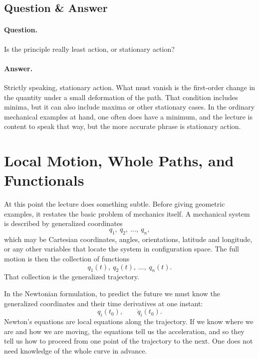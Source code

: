 \subsection{Question \& Answer}

\paragraph{Question.} Is the principle really least action, or stationary action?

\paragraph{Answer.} Strictly speaking, stationary action. What must vanish is the first-order change in the quantity under a small deformation of the path. That condition includes minima, but it can also include maxima or other stationary cases. In the ordinary mechanical examples at hand, one often does have a minimum, and the lecture is content to speak that way, but the more accurate phrase is stationary action.

\section{Local Motion, Whole Paths, and Functionals}

At this point the lecture does something subtle. Before giving geometric examples, it restates the basic problem of mechanics itself. A mechanical system is described by generalized coordinates
\begin{equation}
q_1,\ q_2,\ \dots,\ q_n,
\end{equation}
which may be Cartesian coordinates, angles, orientations, latitude and longitude, or any other variables that locate the system in configuration space. The full motion is then the collection of functions
\begin{equation}
q_1(t),\ q_2(t),\ \dots,\ q_n(t).
\end{equation}
That collection is the generalized trajectory.

In the Newtonian formulation, to predict the future we must know the generalized coordinates and their time derivatives at one instant:
\begin{equation}
q_i(t_0),
\qquad
\dot q_i(t_0).
\end{equation}
Newton's equations are local equations along the trajectory. If we know where we are and how we are moving, the equations tell us the acceleration, and so they tell us how to proceed from one point of the trajectory to the next. One does not need knowledge of the whole curve in advance.

